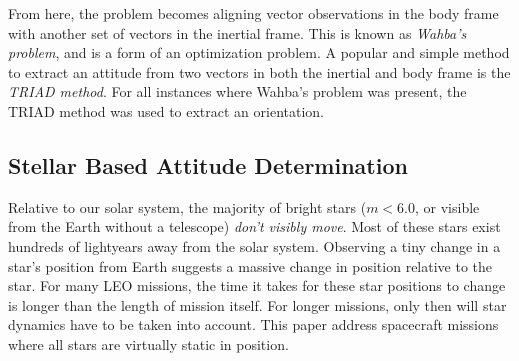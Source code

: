 \begin{figure}
\label{coordinatesystems}
\end{figure}

From here, the problem becomes aligning vector observations in the body frame with another set of vectors in the inertial frame. This is known as \textit{Wahba's problem}, and is a form of an optimization problem. A popular and simple method to extract an attitude from two vectors in both the inertial and body frame is the \textit{TRIAD method}. For all instances where Wahba's problem was present, the TRIAD method was used to extract an orientation. 

\subsection{Stellar Based Attitude Determination}
Relative to our solar system, the majority of bright stars ($m < 6.0$, or visible from the Earth without a telescope) \textit{don't visibly move}. Most of these stars exist hundreds of lightyears away from the solar system. Observing a tiny change in a star's position from Earth suggests a massive change in position relative to the star. For many LEO missions, the time it takes for these star positions to change is longer than the length of mission itself. For longer missions, only then will star dynamics have to be taken into account. This paper address spacecraft missions where all stars are virtually static in position.

